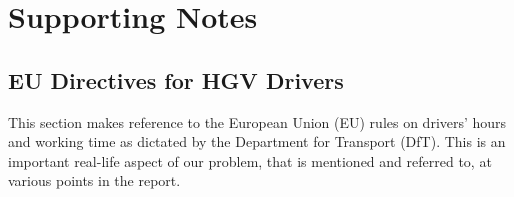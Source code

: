 \section{Supporting Notes}


\subsection{EU Directives for HGV Drivers}
\label{section: EU rules}
This section makes reference to the  European Union (EU) rules on drivers' hours and working time as dictated by the Department for Transport (DfT). This is an important real-life aspect of our problem, that is mentioned and referred to, at various points in the report. %

